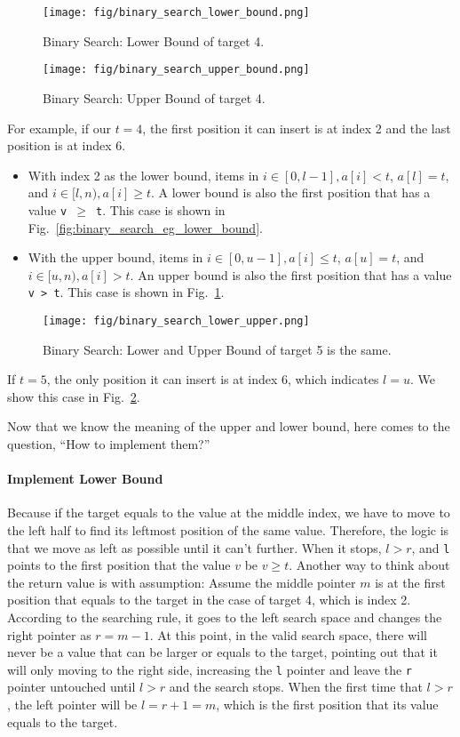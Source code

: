\documentclass[main.tex]{subfiles}
\begin{document}
\begin{figure}[H]
    \centering
    \texttt{[image: fig/binary\_search\_lower\_bound.png]}
        \caption{Binary Search: Lower  Bound of target 4.}
            \label{fig:binary_search_eg_lower_bound}
    \texttt{[image: fig/binary\_search\_upper\_bound.png]}
    \caption{Binary Search: Upper Bound of target 4.}
    \label{fig:binary_search_eg_upper_bound}
\end{figure} 
For example, if our $t=4$, the first position it can insert is at index 2 and the last position is at index 6.
\begin{itemize}
    \item 
With index 2 as the lower bound, 
items in $i \in [0, l-1], a[i]<t$, $a[l] = t$, and $i\in[l, n), a[i] \geq t$. A lower bound is also the first position that has a value \texttt{v $\geq$ t}.  This case is shown in Fig.~\ref{fig:binary_search_eg_lower_bound}.
\item With the upper bound, items in $i \in [0, u-1], a[i]\leq t$, $a[u] = t$, and $i\in[u, n), a[i] > t$. An upper bound is also the first position that has a value \texttt{v > t}.  This case is shown in Fig.~\ref{fig:binary_search_eg_upper_bound}.
\end{itemize}
\begin{figure}[H]
    \centering
    \texttt{[image: fig/binary\_search\_lower\_upper.png]}
        \caption{Binary Search: Lower and Upper  Bound of target 5 is the same.}
   
    \label{fig:binary_search_lower_upper}
\end{figure} 


If $t=5$, the only position it can insert is at index 6, which indicates $l = u$. We show this case in Fig.~\ref{fig:binary_search_lower_upper}.

Now that we know the meaning of the upper and lower bound, here comes to the question, ``How to implement them?''

\paragraph{Implement Lower Bound} Because if the target equals to the value at the middle index, we have to move to the left half to find its leftmost position of the same value. Therefore, the logic is that we move as left as possible until it can't  further. When it stops,  $l>r$, and \texttt{l} points to the first position that the value $v$ be $v\geq t$. Another way to think about the return value is with assumption: Assume the middle pointer $m$ is at the first position that equals to the target in the case of target 4, which is index 2. According to the searching rule, it goes to the left search space and changes the right pointer as  $r=m-1$. At this point, in the valid search space, there will never be a value that can be larger or equals to the target, pointing out that it will only moving to the right side, increasing the \texttt{l} pointer and leave the \texttt{r} pointer untouched until  $l > r$ and the search stops. When the first time that $l > r$, the left pointer will be $l = r + 1 = m$, which is the first position that its value equals to the target. 
\end{document}
